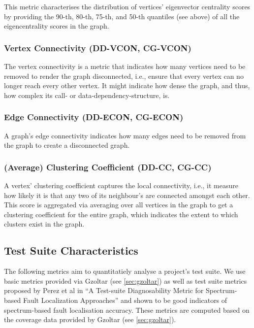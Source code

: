 \documentclass{scrartcl}
\begin{document}
This metric characterises the distribution of vertices' eigenvector centrality
scores by providing the 90-th, 80-th, 75-th, and 50-th quantiles (see above) of
all the eigencentrality scores in the graph.

\subsubsection{Vertex Connectivity (DD-VCON, CG-VCON)}

The vertex connectivity is a metric that indicates how many vertices need to be
removed to render the graph disconnected, i.e., ensure that every vertex can no
longer reach every other vertex. It might indicate how dense the graph, and
thus, how complex its call- or data-dependency-structure, is.

\subsubsection{Edge Connectivity (DD-ECON, CG-ECON)}

A graph's edge connectivity indicates how many edges need to be removed from the
graph to create a disconnected graph.

\subsubsection{(Average) Clustering Coefficient (DD-CC, CG-CC)}

A vertex' clustering coefficient captures the local connectivity, i.e., it
measure how likely it is that any two of its neighbour's are connected amongst
each other. This score is aggregated via averaging over all vertices in the
graph to get a clustering coefficient for the entire graph, which indicates the
extent to which clusters exist in the graph.

\subsection{Test Suite Characteristics}

The following metrics aim to quantitatiely analyse a project's test suite. We
use basic metrics provided via Gzoltar (see \ref{sec:gzoltar}) as well as test
suite metrics proposed by Perez et al in \enquote{A Test-suite Diagnosability
Metric for Spectrum-based Fault Localization Approaches} and shown to be good
indicators of spectrum-based fault localisation accuracy. These metrics are
computed based on the coverage data provided by Gzoltar (see \ref{sec:gzoltar}).
\end{document}
